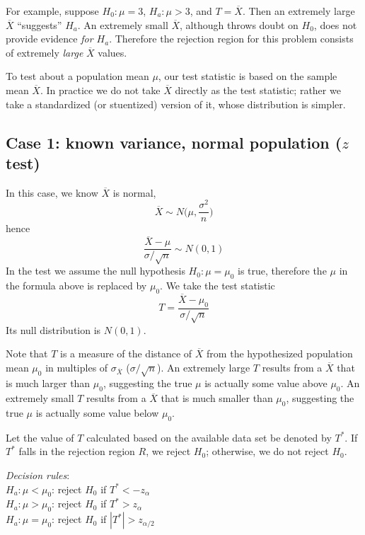 \documentclass[12pt]{article}
\begin{document}
For example,
suppose $H_0: \mu = 3$, $H_a: \mu > 3$, and $T = \overline{X}$.
Then an extremely large $\overline{X}$ ``suggests'' $H_a$.
An extremely small $\overline{X}$,
although throws doubt on $H_0$,
does not provide evidence \emph{for $H_a$}.
Therefore the rejection region for this problem consists of
extremely \emph{large} $\overline{X}$ values.

To test about a population mean $\mu$,
our test statistic is based on the sample mean $\overline{X}$.
In practice we do not take $\overline{X}$ directly as the test
statistic;
rather we take a standardized (or stuentized) version of it,
whose distribution is simpler.

\subsection{Case 1: known variance, normal population ($z$ test)}

In this case, we know $\overline{X}$ is normal,
\[
\overline{X} \sim N\bigg(\mu, \frac{\sigma^2}{n}\biggr)
\]
hence
\begin{equation}\label{eq:case1-T}
\frac{\overline{X} - \mu}{\sigma/\sqrt{n}} \sim N(0,1)
\end{equation}
In the test we assume the null hypothesis $H_0: \mu = \mu_0$ is true,
therefore the $\mu$ in the formula above is replaced by $\mu_0$.
We take the test statistic
\[
T = \frac{\overline{X} - \mu_0}{\sigma/\sqrt{n}}
\]
Its null distribution is $N(0,1)$.

Note that $T$ is a measure of the distance of $\overline{X}$
from the hypothesized population mean $\mu_0$ in multiples of
$\sigma_{\overline{X}}$ (\ie $\sigma/\sqrt{n}$).
An extremely large $T$ results from a $\overline{X}$ that is much larger
than $\mu_0$, suggesting the true $\mu$ is actually some value above $\mu_0$.
An extremely small $T$ results from a $\overline{X}$ that is much smaller
than $\mu_0$, suggesting the true $\mu$ is actually some value below $\mu_0$.

Let the value of $T$ calculated based on the available data set
be denoted by $T^*$.
If $T^*$ falls in the rejection region $R$, we reject $H_0$;
otherwise, we do not reject $H_0$.

\emph{Decision rules}:\\
$H_a: \mu < \mu_0$: reject $H_0$ if $T^* < -z_{\alpha}$\\
$H_a: \mu > \mu_0$: reject $H_0$ if $T^* > z_{\alpha}$\\
$H_a: \mu = \mu_0$: reject $H_0$ if $|T^*| > z_{\alpha/2}$
\end{document}

